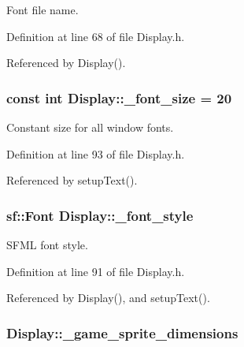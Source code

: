 Font file name. 



Definition at line 68 of file Display.\-h.



Referenced by Display().

\hypertarget{classDisplay_ae10066fc5854e77ea65d3a64912b079a}{
\subsubsection[{\-\_\-font\-\_\-size}]{\setlength{\rightskip}{0pt plus 5cm}const int Display\-::\-\_\-font\-\_\-size = 20\hspace{0.3cm}{\ttfamily [private]}}}\label{classDisplay_ae10066fc5854e77ea65d3a64912b079a}


Constant size for all window fonts. 



Definition at line 93 of file Display.\-h.



Referenced by setup\-Text().

\hypertarget{classDisplay_a937e4b846d090d1d520e15d6233bbfc0}{
\subsubsection[{\-\_\-font\-\_\-style}]{\setlength{\rightskip}{0pt plus 5cm}sf\-::\-Font Display\-::\-\_\-font\-\_\-style\hspace{0.3cm}{\ttfamily [private]}}}\label{classDisplay_a937e4b846d090d1d520e15d6233bbfc0}


S\-F\-M\-L font style. 



Definition at line 91 of file Display.\-h.



Referenced by Display(), and setup\-Text().

\hypertarget{classDisplay_acf0a20ec8a01c1917d62f20ddf2d2f51}{
\subsubsection[{\-\_\-game\-\_\-sprite\-\_\-dimensions}]{ Display\-::\-\_\-game\-\_\-sprite\-\_\-dimensions\hspace{0.3cm}{\ttfamily [private]}}}\label{classDisplay_acf0a20ec8a01c1917d62f20ddf2d2f51}


